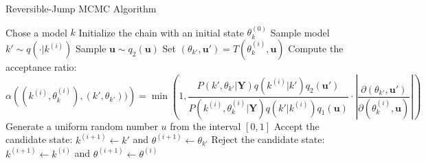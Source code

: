 \begin{algorithm}[H]
\caption{Reversible-Jump MCMC Algorithm}
\label{alg:rjmcmc_A}
\begin{algorithmic}[1]
    \State Chose a model $k$
    \State Initialize the chain with an initial state $\theta^{(0)}_{k}$
         \State Sample model $k' \sim q(\cdot | k^{(i)})$
         \State Sample $\mathbf{u} \sim q_2(\textbf{u})$
	\State Set $(\theta_{k'}, \mathbf{u'}) = T(\theta_k^{(i)}, \mathbf{u})$
        \State Compute the acceptance ratio:
        \[
        \alpha \left((k^{(i)}, \theta_k^{(i)}), (k', \theta_{k'})) \right) = \min\left(1, \frac{P\left(k', \theta_{k'} | \mathbf{Y}\right)q(k^{(i)}|k')q_{2}(\mathbf{u}')}{P\left(k^{(i)}, \theta^{(i)}_{k} | \mathbf{Y}\right)q(k' | k^{(i)})q_{1}(\textbf{u})} \cdot \left| \frac{\partial(\theta_{k'}, \textbf{u}')}{\partial(\theta_k^{(i)}, \textbf{u})}\right| \right)
        \]
        \State Generate a uniform random number $u$ from the interval $[0, 1]$
            \State Accept the candidate state: $k^{(i + 1)} \leftarrow k'$ and  $\theta^{(i+1)} \leftarrow \theta_{k'}$
        \Else
            \State Reject the candidate state:$k^{(i + 1)} \leftarrow k^{(i)}$ and  $\theta^{(i+1)} \leftarrow \theta^{(i)}$
        \EndIf
    \EndFor
\end{algorithmic}
\end{algorithm}



